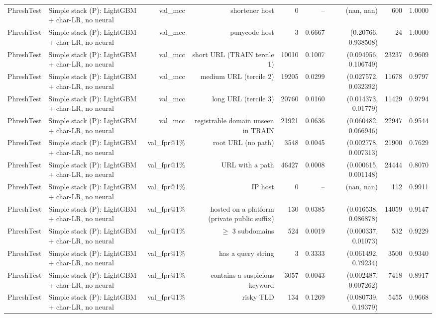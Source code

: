 \begin{table}[t]
\begin{tabular}{llrrrrrrr}
PhreshTest & Simple stack (P): LightGBM + char-LR, no neural & val\_mcc & shortener host & 0 & -- & (nan, nan) & 600 & 1.0000 \\
PhreshTest & Simple stack (P): LightGBM + char-LR, no neural & val\_mcc & punycode host & 3 & 0.6667 & (0.20766, 0.938508) & 24 & 1.0000 \\
PhreshTest & Simple stack (P): LightGBM + char-LR, no neural & val\_mcc & short URL (TRAIN tercile 1) & 10010 & 0.1007 & (0.094956, 0.106749) & 23237 & 0.9609 \\
PhreshTest & Simple stack (P): LightGBM + char-LR, no neural & val\_mcc & medium URL (tercile 2) & 19205 & 0.0299 & (0.027572, 0.032392) & 11678 & 0.9797 \\
PhreshTest & Simple stack (P): LightGBM + char-LR, no neural & val\_mcc & long URL (tercile 3) & 20760 & 0.0160 & (0.014373, 0.01779) & 11429 & 0.9794 \\
PhreshTest & Simple stack (P): LightGBM + char-LR, no neural & val\_mcc & registrable domain unseen in TRAIN & 21921 & 0.0636 & (0.060482, 0.066946) & 22947 & 0.9544 \\
PhreshTest & Simple stack (P): LightGBM + char-LR, no neural & val\_fpr@1\% & root URL (no path) & 3548 & 0.0045 & (0.002778, 0.007313) & 21900 & 0.7629 \\
PhreshTest & Simple stack (P): LightGBM + char-LR, no neural & val\_fpr@1\% & URL with a path & 46427 & 0.0008 & (0.000615, 0.001148) & 24444 & 0.8070 \\
PhreshTest & Simple stack (P): LightGBM + char-LR, no neural & val\_fpr@1\% & IP host & 0 & -- & (nan, nan) & 112 & 0.9911 \\
PhreshTest & Simple stack (P): LightGBM + char-LR, no neural & val\_fpr@1\% & hosted on a platform (private public suffix) & 130 & 0.0385 & (0.016538, 0.086878) & 14059 & 0.9147 \\
PhreshTest & Simple stack (P): LightGBM + char-LR, no neural & val\_fpr@1\% & $\geq$ 3 subdomains & 524 & 0.0019 & (0.000337, 0.01073) & 532 & 0.9229 \\
PhreshTest & Simple stack (P): LightGBM + char-LR, no neural & val\_fpr@1\% & has a query string & 3 & 0.3333 & (0.061492, 0.79234) & 3500 & 0.9340 \\
PhreshTest & Simple stack (P): LightGBM + char-LR, no neural & val\_fpr@1\% & contains a suspicious keyword & 3057 & 0.0043 & (0.002487, 0.007262) & 7418 & 0.8917 \\
PhreshTest & Simple stack (P): LightGBM + char-LR, no neural & val\_fpr@1\% & risky TLD & 134 & 0.1269 & (0.080739, 0.19379) & 5455 & 0.9668 \\

\end{tabular}
\end{table}
